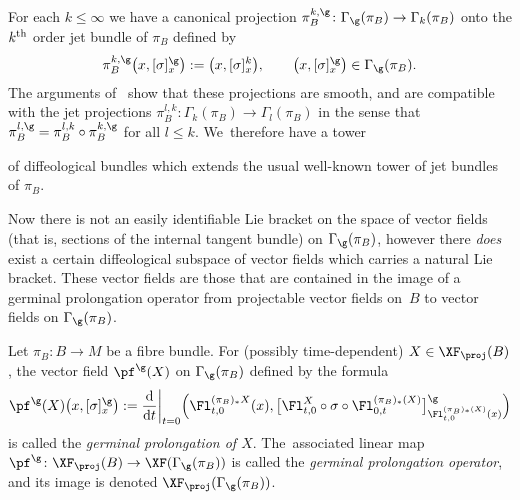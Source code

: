 For each $k\leq\infty$ we have a canonical projection $\pi_{B}^{k,\g}\colon \Gamma_{\g}(\pi_{B})\rightarrow \Gamma_{k}(\pi_{B})$ onto the $k^{\rm th}$ order jet bundle of $\pi_{B}$ defined by
\begin{gather*}
\pi_{B}^{k,\g}\big(x,[\sigma]^{\g}_{x}\big):=\big(x,[\sigma]^{k}_{x}\big),\qquad \big(x,[\sigma]^{\g}_{x}\big)\in\Gamma_{\g}(\pi_{B}).
\end{gather*}
The arguments of~\cite[Proposition~5.14]{mac3} show that these projections are smooth, and are compatible with the jet projections $\pi_{B}^{l,k}\colon \Gamma_{k}(\pi_{B})\rightarrow \Gamma_{l}(\pi_{B})$ in the sense that $\pi_{B}^{l,\g} = \pi_{B}^{l,k}\circ\pi_{B}^{k,\g}$ for all $l\leq k$. We~therefore have a tower
\begin{center}
\end{center}
of diffeological bundles which extends the usual well-known tower of jet bundles of $\pi_{B}$.

Now there is not an easily identifiable Lie bracket on the space of vector fields (that is, sections of the internal tangent bundle) on $\Gamma_{\g}(\pi_{B})$, however there \textit{does} exist a certain diffeological subspace of vector fields which carries a natural Lie bracket. These vector fields are those that are contained in the image of a germinal prolongation operator from projectable vector fields on~$B$ to vector fields on $\Gamma_{\g}(\pi_{B})$.

\begin{Definition}
Let $\pi_{B}\colon B\rightarrow M$ be a fibre bundle. For (possibly time-dependent) $X\in\XF_{\proj}(B)$, the vector field $\pf^{\g}(X)$ on $\Gamma_{\g}(\pi_{B})$ defined by the formula
\begin{gather*}
\pf^{\g}(X)\big(x,[\sigma]^{\g}_{x}\big):=\frac{\rm d}{{\rm d}t}\bigg|_{t=0} \Big(\Fl^{(\pi_{B})_{*}X}_{t,0}(x),\big[\Fl^{X}_{t,0}\circ\sigma \circ\Fl^{(\pi_{B})_{*}(X)}_{0,t}\big]^{\g}_{\Fl^{(\pi_{B})_{*}(X)}_{t,0}(x)}\Big)
\end{gather*}
is called the \textit{germinal prolongation of $X$}. The~associated linear map $\pf^{\g}\colon \XF_{\proj}(B)\rightarrow \XF(\Gamma_{\g}(\pi_{B}))$ is called the \textit{germinal prolongation operator}, and its image is denoted $\XF_{\proj}(\Gamma_{\g}(\pi_{B}))$.
\end{Definition}

